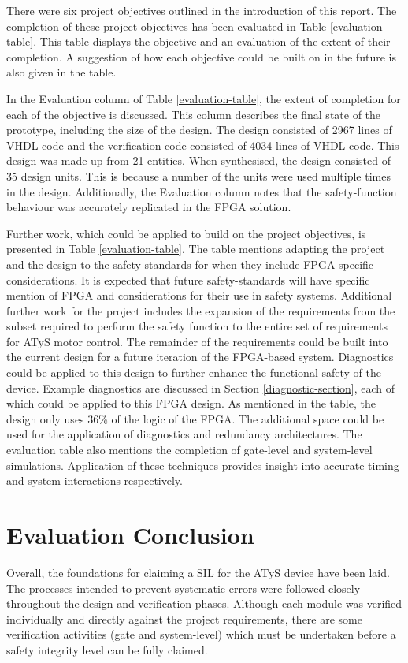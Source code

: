 


There were six project objectives outlined in the introduction of this report. The completion of these project objectives has been evaluated in Table \ref{evaluation-table}. This table displays the objective and an evaluation of the extent of their completion. A suggestion of how each objective could be built on in the future is also given in the table. 

In the Evaluation column of Table \ref{evaluation-table}, the extent of completion for each of the objective is discussed. This column describes the final state of the prototype, including the size of the design. The design consisted of 2967 lines of VHDL code and the verification code consisted of 4034 lines of VHDL code. This design was made up from 21 entities. When synthesised, the design consisted of 35 design units. This is because a number of the units were used multiple times in the design. Additionally, the Evaluation column notes that the safety-function behaviour was accurately replicated in the FPGA solution.

Further work, which could be applied to build on the project objectives, is presented in Table \ref{evaluation-table}. The table mentions adapting the project and the design to the safety-standards for when they include FPGA specific considerations. It is expected that future safety-standards will have specific mention of FPGA and considerations for their use in safety systems. Additional further work for the project includes the expansion of the requirements from the subset required to perform the safety function to the entire set of requirements for ATyS motor control. The remainder of the requirements could be built into the current design for a future iteration of the FPGA-based system. Diagnostics could be applied to this design to further enhance the functional safety of the device. Example diagnostics are discussed in Section \ref{diagnostic-section}, each of which could be applied to this FPGA design. As mentioned in the table, the design only uses 36\% of the logic of the FPGA. The additional space could be used for the application of diagnostics and redundancy architectures. The evaluation table also mentions the completion of gate-level and system-level simulations. Application of these techniques provides insight into accurate timing and system interactions respectively.



\section{Evaluation Conclusion}
Overall, the foundations for claiming a SIL for the ATyS device have been laid. The processes intended to prevent systematic errors were followed closely throughout the design and verification phases. Although each module was verified individually and directly against the project requirements, there are some verification activities (gate and system-level) which must be undertaken before a safety integrity level can be fully claimed.

